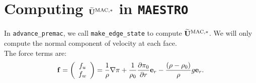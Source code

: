 \documentclass[11pt]{article}
\def\mac   {\rm MAC}
\def\eb    {{\bf e}}
\def\fb    {{\bf f}}
\def\Ubt   {\widetilde{\bf U}}
\begin{document}
\section{Computing $\Ubt^{\mac,*}$ in {\tt MAESTRO}}
In {\tt advance\_premac}, we call {\tt make\_edge\_state} to compute $\Ubt^{\mac,*}$.  We will only compute the normal component of velocity at each face.\\

The force terms are:
\begin{equation}
\fb =
\left(\begin{array}{c}
f_u \\
f_w \\
\end{array}\right)
= \frac{1}{\rho}\nabla\pi + \frac{1}{\rho_0}\frac{\partial\pi_0}{\partial r}\eb_r - \frac{(\rho-\rho_0)}{\rho}g\eb_r.\label{Force Term}
\end{equation}
\end{document}
